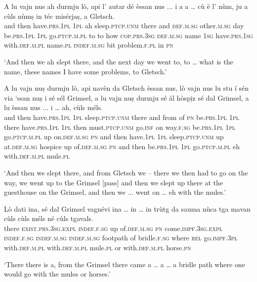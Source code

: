 \begin{linenumbers}
\gll  A lu vajn nus ah durmju lò, api l’ autar dé èssan nus ... i a a … cù è l' nùm, ju a cùls nùmṣ in téc misérjaṣ, a Gletsch.  \\ 
and then have.\textsc{prs.1pl} \textsc{1pl} ah sleep.\textsc{ptcp.unm} there and \textsc{def.m.sg} other.\textsc{m.sg} day be.\textsc{prs.1pl} \textsc{1pl} {} go.\textsc{ptcp.m.pl} to to {} how \textsc{cop.prs.3sg} \textsc{def.m.sg} name \textsc{1sg} have.\textsc{prs.1sg} with.\textsc{def.m.pl} name.\textsc{pl} \textsc{indef.m.sg} bit problem.\textsc{f.pl} in \textsc{pn} \\
\end{linenumbers}
\medskip
\glt `And then we ah slept there, and the next day we went to, to … what is the name, these names I have some problems, to Gletsch.'
\medskip

\begin{linenumbers}
\gll   A lu vajn nuṣ durmju lò, api navèn da Gletsch èssan nus, lò vajn nus lu stu í sén via\footnotemark{} `ssan nuṣ i sé sél Grimsel, a lu vajn nuṣ durmju sé ál hòspi̱z sé dal Grimsel, a lu èssan nus ... i … ah, cùls méls. \\
and then  have.\textsc{prs.1pl} \textsc{1pl} sleep.\textsc{ptcp.unm} there and from of \textsc{pn} be.\textsc{prs.1pl} \textsc{1pl} there have.\textsc{prs.1pl}  \textsc{1pl} then must.\textsc{ptcp.unm} go.\textsc{inf} on way.\textsc{f.sg} be.\textsc{prs.1pl} \textsc{1pl} go.\textsc{ptcp.m.pl} up on.\textsc{def.m.sg}  \textsc{pn} and then have.\textsc{1pl} \textsc{1pl} sleep.\textsc{ptcp.unm} up at.\textsc{def.m.sg} hospice up of.\textsc{def.m.sg} \textsc{pn} and then be.\textsc{prs.1pl}  \textsc{1pl} {} go.\textsc{ptcp.m.pl} {} eh with.\textsc{def.m.pl}  mule.\textsc{pl} \\
\end{linenumbers}
\medskip
\glt `And then we slept there, and from Gletsch we – there we then had to go on the way, we went up to the Grimsel [pass] and then we slept up there at the guesthouse on the Grimsel, and then we ... went on … eh with the mules.'
\medskip

\begin{linenumbers}
\gll Lò dati ina, sé dal Grimsel vagnévi ina … in … in trùtg da sauma nùca tga mavan cùls cùls méls né cùls tgavals.\\
there \textsc{exist.prs.3sg.expl} \textsc{indef.f.sg} up of.\textsc{def.m.sg}  \textsc{pn}  come.\textsc{impf.3sg.expl} \textsc{indef.f.sg} {} \textsc{indef.m.sg} {} \textsc{indef.m.sg} footpath of bridle.\textsc{f.sg} where \textsc{rel} go.\textsc{impf.3pl} with.\textsc{def.m.pl} with.\textsc{def.m.pl} mule.\textsc{pl} or with.\textsc{def.m.pl} horse.\textsc{pn}\\
\end{linenumbers}
\medskip
\glt `There there is a, from the Grimsel there came a … a … a bridle path where one would go with the mules or horses.'
\medskip


